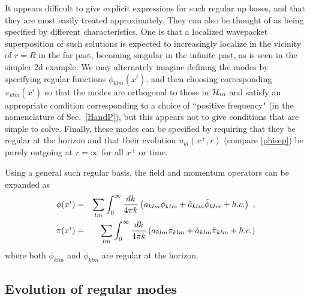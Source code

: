 \documentclass[12pt]{article}
\numberwithin{equation}{section}
\newcommand{\calh}{{\cal H}}
\newcommand{\bea}{\begin{eqnarray}}
\newcommand{\eea}{\end{eqnarray}}
\begin{document}
It appears difficult to give explicit expressions for such regular up bases, and that they are most easily treated approximately.  They can also be thought of as being specified by different characteristics.  One is that a localized wavepacket superposition of such solutions is expected to increasingly localize in the vicinity of $r=R$ in the far past, becoming singular in the infinite past, as is  seen in the simpler 2d example\cite{SE2d}.  
We may alternately imagine defining the modes by specifying regular functions $\phi_{klm}(x^i)$, and then choosing corresponding $\pi_{klm}(x^i)$ so that the modes are orthogonal to those in $\calh_{in}$ and satisfy an appropriate condition corresponding to a choice of ``positive frequency" (in the nomenclature of Sec.~\ref{HandP}), but this appears not to give conditions that are simple to solve.  Finally, these modes can be specified by requiring that they be regular at the horizon and that their evolution $u_{kl}(x^+,r)$ (compare \eqref{phisep}) be purely outgoing at $r=\infty$ for all $x^+$ or time.  


Using a general such regular basis, the field and momentum operators can be expanded as
\bea\label{Fexp}
\phi(x^i)&=&\sum_{lm} \int_0^{\infty}\frac{dk}{4\pi k} \left(a_{klm}\phi_{klm}+\tilde{a}_{klm}\tilde{\phi}_{klm}+h.c.\right)\ ,\cr
\pi(x^i)&=&\sum_{lm} \int_0^{\infty}\frac{dk}{4\pi k} \left(a_{klm}\pi_{klm}+\tilde{a}_{klm}\tilde{\pi}_{klm}+h.c.\right)
\eea 
where both $\phi_{klm}$ and $\tilde{\phi}_{klm}$ are regular at the horizon. 

\subsection{Evolution of regular modes}
\end{document}
